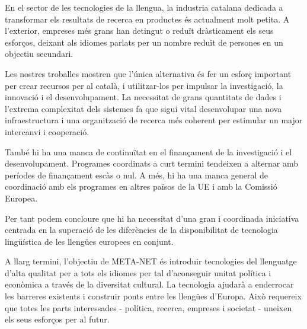 \begin{multicols}{2}
En el sector de les tecnologies de la llengua, la industria catalana dedicada a transformar els resultats de recerca en productes és actualment molt petita. A l'exterior, empreses més grans han detingut o reduït dràsticament els seus esforços, deixant als idiomes parlats per un nombre reduït de persones en un objectiu secundari.

Les nostres troballes mostren que l'única alternativa és fer un esforç important per crear recursos per al català, i utilitzar-los per impulsar la investigació, la innovació i el desenvolupament. La necessitat de grans quantitats de dades i l'extrema complexitat dels sistemes fa que sigui vital desenvolupar una nova infraestructura i una organització de recerca més coherent per estimular un major intercanvi i cooperació.

També hi ha una manca de continuïtat en el finançament de la investigació i el desenvolupament. Programes coordinats a curt termini tendeixen a alternar amb períodes de finançament escàs o nul. A més, hi ha una manca general de coordinació amb els programes en altres països de la UE i amb la Comissió Europea.

Per tant podem concloure que hi ha necessitat d'una gran i coordinada iniciativa centrada en la superació de les diferències de la disponibilitat de tecnologia lingüística de les llengües europees en conjunt.


A llarg termini, l’objectiu de META-NET és introduir tecnologies del llenguatge d'alta qualitat per a tots els idiomes per tal d'aconseguir unitat política i econòmica a través de la diversitat cultural. La tecnologia ajudarà a enderrocar les barreres existents i construir ponts entre les llengües d'Europa. Això requereix que totes les parts interessades - política, recerca, empreses i societat - uneixen els seus esforços per al futur.


\end{multicols}

\cleardoublepage




